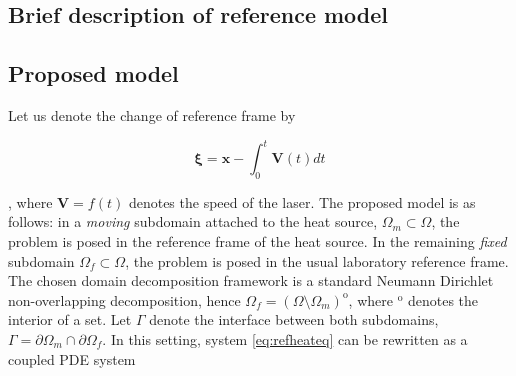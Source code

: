 \subsection{Brief description of reference model}
  

\subsection{Proposed model}

Let us denote the change of reference frame by

$$
\mathbf{\xi} = \mathbf{x} - \int_0^t \mathbf{V}(t) dt
$$

, where $\mathbf{V} = f(t)$ denotes the
speed of the laser.
The proposed model is as follows:
in a \textit{moving} subdomain attached to the heat source,
$\Omega_m \subset \Omega$,
the problem is posed in the reference frame of the heat source.
In the remaining
\textit{fixed} subdomain $\Omega_f \subset \Omega$,
the problem is posed
in the usual laboratory reference frame.
The chosen domain decomposition framework is
a standard Neumann Dirichlet non-overlapping decomposition,
hence $\Omega_f = (\Omega \setminus \Omega_m)^{\mathrm{o}}$,
where ${}^{\mathrm{o}}$ denotes the interior of a set. Let
$\Gamma$ denote the interface between both subdomains,
$\Gamma = \partial \Omega_m \cap \partial \Omega_f$. In this
setting, system \ref{eq:refheateq} can be rewritten as
a coupled PDE system

